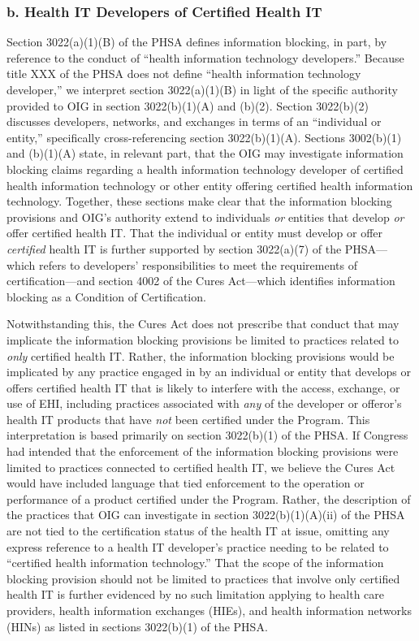 \documentclass[twoside,11pt]{article}
\begin{document}
          \subsubsection{b. Health IT Developers of Certified Health IT}


          Section 3022(a)(1)(B) of the PHSA defines information blocking, in part, by reference to the conduct of “health information technology developers.” Because title XXX of the PHSA does not define “health information technology developer,” we interpret section 3022(a)(1)(B) in light of the specific authority provided to OIG in section 3022(b)(1)(A) and (b)(2). Section 3022(b)(2) discusses developers, networks, and exchanges in terms of an “individual or entity,” specifically cross-referencing section 3022(b)(1)(A). Sections 3002(b)(1) and (b)(1)(A) state, in relevant part, that the OIG may investigate information blocking claims regarding a health information technology developer of certified health information technology or other entity offering certified health information technology. Together, these sections make clear that the information blocking provisions and OIG's authority extend to individuals \emph{or} entities that develop \emph{or} offer certified health IT. That the individual or entity must develop or offer \emph{certified} health IT is further supported by section 3022(a)(7) of the PHSA—which refers to developers' responsibilities to meet the requirements of certification—and section 4002 of the Cures Act—which identifies information blocking as a Condition of Certification.



          Notwithstanding this, the Cures Act does not prescribe that conduct that may implicate the information blocking provisions be limited to practices related to \emph{only} certified health IT. Rather, the information blocking provisions would be implicated by any practice engaged in by an individual or entity that develops or offers certified health IT that is likely to interfere with the access, exchange, or use of EHI, including practices associated with \emph{any} of the developer or offeror's health IT products that have \emph{not} been certified under the Program. This interpretation is based primarily on section 3022(b)(1) of the PHSA. If Congress had intended that the enforcement of the information blocking provisions were limited to practices connected to certified health IT, we believe the Cures Act would have included language that tied enforcement to the operation or performance of a product certified under the Program. Rather, the description of the practices that OIG can investigate in section 3022(b)(1)(A)(ii) of the PHSA are not tied to the certification status of the health IT at issue, omitting any express reference to a health IT developer's practice needing to be related to “certified health information technology.” That the scope of the information blocking provision should not be limited to practices that involve only certified health IT is further evidenced by no such limitation applying to health care providers, health information exchanges (HIEs), and health information networks (HINs) as listed in sections 3022(b)(1) of the PHSA.
\end{document}
